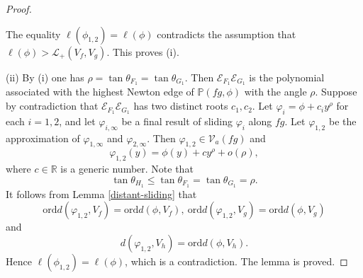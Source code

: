\documentclass[reqno, 12pt ,a4letter]{amsart}
\theoremstyle{definition}
\begin{document}
\begin{proof}
\begin{itemize}
\end{itemize}
The equality $\ell(\phi_{1,2})=\ell(\phi)$ contradicts the assumption that $\ell(\phi) > \mathscr{L}_+(V_f, V_g)$.  This proves (i).

(ii) By (i) one has $\rho=\tan \theta_{F_1} = \tan\theta_{G_1}$. Then $\mathcal{E}_{F_1}\mathcal{E}_{G_1}$ is the polynomial associated with the highest Newton edge of $\mathbb{P}(fg, \phi)$ with the angle $\rho$. Suppose by contradiction that $\mathcal{E}_{F_1}\mathcal{E}_{G_1}$ has two distinct roots $c_1,c_2$. Let $\varphi_i=\phi+c_i y^{\rho }$ for each $i=1,2$, and let $\varphi_{i,\infty}$ be a final result of sliding $\varphi_i$ along $fg$. Let $\varphi_{1,2}$ be the approximation of $\varphi_{1,\infty}$ and $\varphi_{2,\infty}$. Then $\varphi_{1,2}\in \mathcal{V}_a(fg)$ and 
	$$ \varphi_{1,2}(y) = \phi(y) + cy^{\rho} + o(\rho), $$ where $c \in \mathbb{R}$ is a generic number. Note that 
    $$\tan \theta_{H_1}\leq \tan \theta_{F_1}=\tan \theta_{G_1}=\rho.$$
    It follows from Lemma \ref{distant-sliding} that
    $$\mathrm{ord}d(\varphi_{1,2},V_f)=\mathrm{ord}d(\phi,V_f),\ \mathrm{ord}d(\varphi_{1,2},V_g)=\mathrm{ord}d(\phi,V_g) $$
	and
    $$d(\varphi_{1,2},V_h)=\mathrm{ord}d(\phi,V_h).$$
    Hence $\ell(\phi_{1,2})=\ell(\phi)$, which is a contradiction. The lemma is proved.    
\end{proof}
\end{document}
